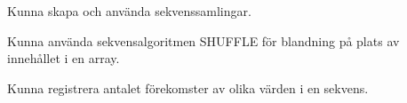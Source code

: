 
\item Kunna skapa och använda sekvenssamlingar.
\item Kunna använda sekvensalgoritmen SHUFFLE för blandning på plats av innehållet i en array.
\item Kunna registrera antalet förekomster av olika värden i en sekvens.

